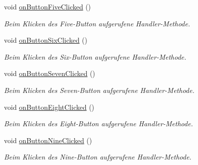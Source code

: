 \begin{DoxyCompactItemize}
\hypertarget{class_num_pad_aa494f765620859681fa7daac1b6dbc57}{}\label{class_num_pad_aa494f765620859681fa7daac1b6dbc57} 
void \hyperlink{class_num_pad_aa494f765620859681fa7daac1b6dbc57}{on\+Button\+Five\+Clicked} ()
\begin{DoxyCompactList}\small\item\em Beim Klicken des Five-\/\+Button aufgerufene Handler-\/\+Methode. \end{DoxyCompactList}\item 
\hypertarget{class_num_pad_a0eec28eb14ac08a0bd90eebcd43bfea6}{}\label{class_num_pad_a0eec28eb14ac08a0bd90eebcd43bfea6} 
void \hyperlink{class_num_pad_a0eec28eb14ac08a0bd90eebcd43bfea6}{on\+Button\+Six\+Clicked} ()
\begin{DoxyCompactList}\small\item\em Beim Klicken des Six-\/\+Button aufgerufene Handler-\/\+Methode. \end{DoxyCompactList}\item 
\hypertarget{class_num_pad_a249c3837cc94eea7e2fdec57d78e1d6b}{}\label{class_num_pad_a249c3837cc94eea7e2fdec57d78e1d6b} 
void \hyperlink{class_num_pad_a249c3837cc94eea7e2fdec57d78e1d6b}{on\+Button\+Seven\+Clicked} ()
\begin{DoxyCompactList}\small\item\em Beim Klicken des Seven-\/\+Button aufgerufene Handler-\/\+Methode. \end{DoxyCompactList}\item 
\hypertarget{class_num_pad_aefad78a1724a0962dc66df3f8b434a8a}{}\label{class_num_pad_aefad78a1724a0962dc66df3f8b434a8a} 
void \hyperlink{class_num_pad_aefad78a1724a0962dc66df3f8b434a8a}{on\+Button\+Eight\+Clicked} ()
\begin{DoxyCompactList}\small\item\em Beim Klicken des Eight-\/\+Button aufgerufene Handler-\/\+Methode. \end{DoxyCompactList}\item 
\hypertarget{class_num_pad_a453339b8ce818824204f96607708c916}{}\label{class_num_pad_a453339b8ce818824204f96607708c916} 
void \hyperlink{class_num_pad_a453339b8ce818824204f96607708c916}{on\+Button\+Nine\+Clicked} ()
\begin{DoxyCompactList}\small\item\em Beim Klicken des Nine-\/\+Button aufgerufene Handler-\/\+Methode. \end{DoxyCompactList}\item 
\hypertarget{class_num_pad_a153332f9a9b050037329d054d8cac6ae}{}\label{class_num_pad_a153332f9a9b050037329d054d8cac6ae} 

\end{DoxyCompactItemize}
